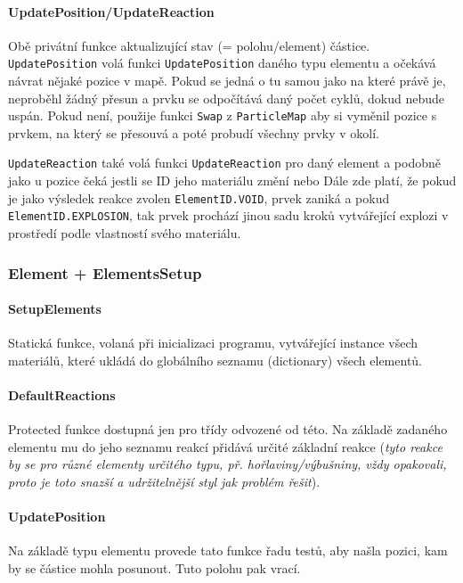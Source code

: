 \documentclass[a4paper, 12pt]{article}
\begin{document}
\paragraph{UpdatePosition/UpdateReaction}
Obě privátní funkce aktualizující stav (= polohu/element) částice.
\texttt{UpdatePosition} volá funkci \texttt{UpdatePosition} daného typu
elementu a očekává návrat nějaké pozice v mapě. Pokud se jedná o tu samou jako
na které právě je, neproběhl žádný přesun a prvku se odpočítává daný počet
cyklů, dokud nebude uspán. Pokud není, použije funkci \texttt{Swap} z \texttt{ParticleMap} 
aby si vyměnil pozice s prvkem, na který se přesouvá a poté probudí 
všechny prvky v okolí.

\texttt{UpdateReaction} také volá funkci \texttt{UpdateReaction} pro daný
element a podobně jako u pozice čeká jestli se ID jeho materiálu změní nebo
Dále zde platí, že pokud je jako výsledek reakce zvolen
\texttt{ElementID.VOID}, prvek zaniká a pokud \texttt{ElementID.EXPLOSION}, tak
prvek prochází jinou sadu kroků vytvářející explozi v prostředí podle
vlastností svého materiálu.

\subsubsection{Element + ElementsSetup}
\paragraph{SetupElements}
Statická funkce, volaná při inicializaci programu, vytvářející instance všech
materiálů, které ukládá do globálního seznamu (dictionary) všech elementů.

\paragraph{DefaultReactions}
Protected funkce dostupná jen pro třídy odvozené od této. Na základě zadaného
elementu mu do jeho seznamu reakcí přidává určité základní reakce (\emph{tyto
reakce by se pro různé elementy určitého typu, př. hořlaviny/výbušniny, vždy opakovali, proto je toto snazší a
udržitelnější styl jak problém řešit}).

\paragraph{UpdatePosition}
Na základě typu elementu provede tato funkce řadu testů, aby našla pozici, kam
by se částice mohla posunout. Tuto polohu pak vrací.
\end{document}
